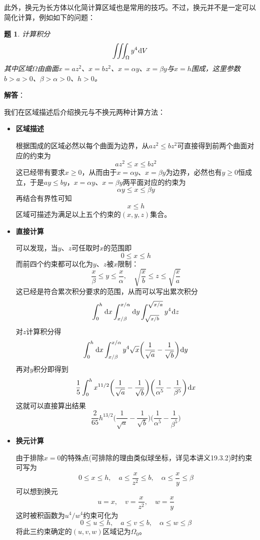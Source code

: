 \documentclass[a4paper,UTF8,fontset=windows,AutoFakeBold]{ctexart}
\newcommand*{\dr}{\hspace{0.07em}\mathrm{d}}
\theoremstyle{ex}
\newtheorem{exercise}{题}
\newcommand{\sol}[1]{{\vspace{5pt}\kaishu\noindent\textbf{解答}：\vspace{-3pt}
\begin{compactitem}
    \item[] #1
\end{compactitem}
}}
\begin{document}
此外，换元为长方体以化简计算区域也是常用的技巧。不过，换元并不是一定可以简化计算，例如如下的问题：
\begin{framed}
\begin{exercise}
    计算积分
    $$\iiint_\Omega y^4\dr V$$
    其中区域$\Omega$由曲面$x=az^2$、$x=bz^2$、$x=\alpha y$、$x=\beta y$与$x=h$围成，这里参数$b>a>0$、$\beta>\alpha>0$、$h>0$。
\end{exercise}
\sol{
    我们在区域描述后介绍换元与不换元两种计算方法：
    \begin{itemize}
        \item \textbf{区域描述}
        
        根据围成的区域必然以每个曲面为边界，从$az^2\le bz^2$可直接得到前两个曲面对应的约束为
        $$az^2\le x\le bz^2$$
        这已经带有要求$x\ge0$，从而由于$x=\alpha y$、$x=\beta y$为边界，必然也有$y\ge0$恒成立，于是$ay\le by$，$x=\alpha y$、$x=\beta y$两平面对应的约束为
        $$\alpha y\le x\le\beta y$$
        再结合有界性可知
        $$x\le h$$
        区域可描述为满足以上五个约束的$(x,y,z)$集合。
        
        \item \textbf{直接计算}
        
        可以发现，当$y$、$z$可任取时$x$的范围即
        $$0\le x\le h$$
        而前四个约束都可以化为$y$、$z$被$x$限制：
        $$\frac{x}{\beta}\le y\le\frac{x}{\alpha},\quad\sqrt{\frac{x}{b}}\le z\le\sqrt{\frac{x}{a}}$$
        这已经是符合累次积分要求的范围，从而可以写出累次积分
        $$\int_0^h\dr x\int_{x/\beta}^{x/\alpha}\dr y\int_{\sqrt{x/b}}^{\sqrt{x/a}}y^4\dr z$$
        对$z$计算积分得
        $$\int_0^h\dr x\int_{x/\beta}^{x/\alpha}y^4\sqrt{x}\bigg(\frac{1}{\sqrt a}-\frac{1}{\sqrt b}\bigg)\dr y$$
        再对$y$积分即得到
        $$\frac{1}{5}\int_0^hx^{11/2}\bigg(\frac{1}{\sqrt a}-\frac{1}{\sqrt b}\bigg)\bigg(\frac{1}{\alpha^5}-\frac{1}{\beta^5}\bigg)\dr x$$
        这就可以直接算出结果
        $$\frac{2}{65}h^{13/2}\bigg(\frac{1}{\sqrt a}-\frac{1}{\sqrt b}\bigg)\bigg(\frac{1}{\alpha^5}-\frac{1}{\beta^5}\bigg)$$

        \item \textbf{换元计算}
        
        由于排除$x=0$的特殊点(可排除的理由类似球坐标，详见本讲义19.3.2)时约束可写为
        $$0\le x\le h,\quad a\le\frac{x}{z^2}\le b,\quad\alpha\le\frac{x}{y}\le\beta$$
        可以想到换元
        $$u=x,\quad v=\frac{x}{z^2},\quad w=\frac{x}{y}$$
        这时被积函数为$u^4/w^4$约束可化为
        $$0\le u\le h,\quad a\le v\le b,\quad\alpha\le w\le\beta$$
        将此三约束确定的$(u,v,w)$区域记为$\Omega_0$。


\end{itemize}}
\end{framed}
\end{document}
